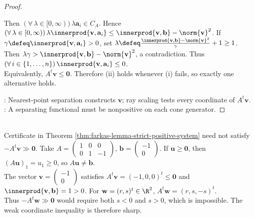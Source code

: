 \begin{theorem}
\begin{proof}
\begin{enumerate}[label=(\roman*)]
Then $(\forall\,\lambda\in[0,\infty))\,\lambda\mathbf{a}_i\in C_A$. Hence $(\forall\,\lambda\in[0,\infty))\,\lambda\innerprod{\mathbf{v},\mathbf{a}_i}\leq\innerprod{\mathbf{v},\mathbf{b}}-\norm{\mathbf{v}}^2$. If $\gamma\defeq\innerprod{\mathbf{v},\mathbf{a}_i}>0$, set $\lambda\defeq\frac{\innerprod{\mathbf{v},\mathbf{b}}-\norm{\mathbf{v}}^2}{\gamma}+1\geq1$.\\
Then $\lambda\gamma>\innerprod{\mathbf{v},\mathbf{b}}-\norm{\mathbf{v}}^2$, a contradiction. Thus $(\forall\,i\in\{1,\ldots,n\})\,\innerprod{\mathbf{v},\mathbf{a}_i}\leq0$.\\
Equivalently, $A^t\mathbf{v}\leq\mathbf{0}$. Therefore (ii) holds whenever (i) fails, so exactly one alternative holds.
\end{enumerate}
: Nearest-point separation constructs $\mathbf{v}$; ray scaling tests every coordinate of $A^t\mathbf{v}$.\\
: A separating functional must be nonpositive on each cone generator.
\end{proof}
\end{theorem}

\begin{counterexample} \label{cex:farkas-strict-certificate-impossible} \\
Certificate in Theorem \ref{thm:farkas-lemma-strict-positive-system} need not satisfy $-A^t\mathbf{v}\gg\mathbf{0}$. Take $A=\left(\begin{smallmatrix}1&0&0\\0&1&-1\end{smallmatrix}\right)$, $\mathbf{b}=\left(\begin{smallmatrix}-1\\0\end{smallmatrix}\right)$. If $\mathbf{u}\geq\mathbf{0}$, then $(A\mathbf{u})_1=u_1\geq0$, so $A\mathbf{u}\neq\mathbf{b}$.\\
The vector $\mathbf{v}=\left(\begin{smallmatrix}-1\\0\end{smallmatrix}\right)$ satisfies $A^t\mathbf{v}=(-1,0,0)^t\leq\mathbf{0}$ and $\innerprod{\mathbf{v},\mathbf{b}}=1>0$. For $\mathbf{w}=(r,s)^t\in\R^2$, $A^t\mathbf{w}=(r,s,-s)^t$.\\
Thus $-A^t\mathbf{w}\gg\mathbf{0}$ would require both $s<0$ and $s>0$, which is impossible. The weak coordinate inequality is therefore sharp.
\end{counterexample}
